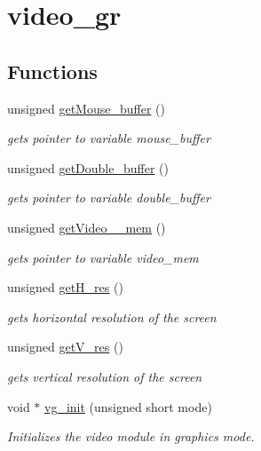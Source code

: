 \hypertarget{group__video__gr}{}\section{video\+\_\+gr}
\label{group__video__gr}
\subsection*{Functions}
\begin{DoxyCompactItemize}
\item 
unsigned \hyperlink{group__video__gr_ga80f6be1470280496d613f43fbf4f576c}{get\+Mouse\+\_\+buffer} ()
\begin{DoxyCompactList}\small\item\em gets pointer to variable mouse\+\_\+buffer \end{DoxyCompactList}\item 
unsigned \hyperlink{group__video__gr_gafa0e51016d7aa337778300ba2ec70a74}{get\+Double\+\_\+buffer} ()
\begin{DoxyCompactList}\small\item\em gets pointer to variable double\+\_\+buffer \end{DoxyCompactList}\item 
unsigned \hyperlink{group__video__gr_gae633b6fb3ed1e90fdcbc7b4c65ffe2ef}{get\+Video\+\_\+\+\_\+mem} ()
\begin{DoxyCompactList}\small\item\em gets pointer to variable video\+\_\+mem \end{DoxyCompactList}\item 
unsigned \hyperlink{group__video__gr_gaf597a67a797839097222fa9b4ae20b3f}{get\+H\+\_\+res} ()
\begin{DoxyCompactList}\small\item\em gets horizontal resolution of the screen \end{DoxyCompactList}\item 
unsigned \hyperlink{group__video__gr_ga36f1c43e43d903e085207548cf8d48a2}{get\+V\+\_\+res} ()
\begin{DoxyCompactList}\small\item\em gets vertical resolution of the screen \end{DoxyCompactList}\item 
void $\ast$ \hyperlink{group__video__gr_gacef21667c79365d57a084bed994c2189}{vg\+\_\+init} (unsigned short mode)
\begin{DoxyCompactList}\small\item\em Initializes the video module in graphics mode. \end{DoxyCompactList}\item 

\end{DoxyCompactItemize}
